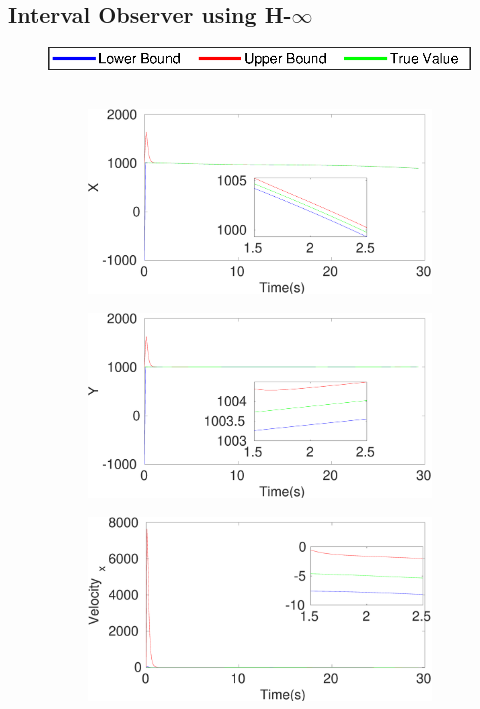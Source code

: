 \clearpage
\subsection{Interval Observer using H-$\infty$}\label{eresult:hinf}
\FloatBarrier
\begin{figure}[!h]
\hspace*{\fill} \includegraphics[scale=0.8]{figures/legend}\\\\
\begin{subfigure}{.5\linewidth}
\centering
\includegraphics[width=\linewidth]{figures/HInf/s3cvHInfX}
\end{subfigure}
\begin{subfigure}{.5\linewidth}
\centering
\includegraphics[width=\linewidth]{figures/HInf/s3cvHInfY}
\end{subfigure}
\begin{subfigure}{.5\linewidth}
\centering
\includegraphics[width=\linewidth]{figures/HInf/s3cvHInfVelocity_x}

\end{subfigure}
\end{figure}
